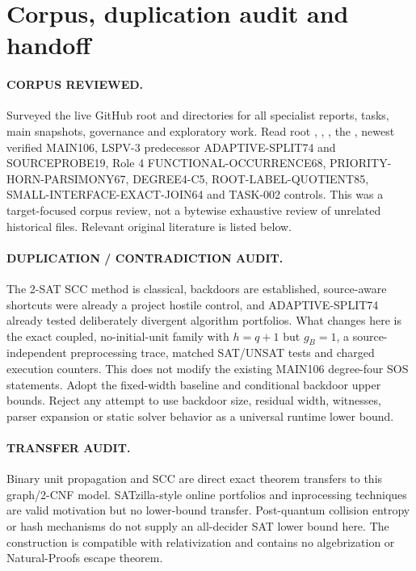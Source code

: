 \documentclass[11pt]{article}
\begin{document}
\section{Corpus, duplication audit and handoff}
\paragraph{CORPUS REVIEWED.}
Surveyed the live GitHub root and directories for all specialist
reports, tasks, main snapshots, governance and exploratory work.
Read root , , ,
the , newest verified MAIN106,
LSPV-3 predecessor ADAPTIVE-SPLIT74 and SOURCEPROBE19,
Role 4 FUNCTIONAL-OCCURRENCE68, PRIORITY-HORN-PARSIMONY67,
DEGREE4-C5, ROOT-LABEL-QUOTIENT85,
SMALL-INTERFACE-EXACT-JOIN64 and TASK-002 controls.
This was a target-focused corpus review, not a bytewise
exhaustive review of unrelated historical files.
Relevant original literature is listed below.

\paragraph{DUPLICATION / CONTRADICTION AUDIT.}
The 2-SAT SCC method is classical, backdoors are established,
source-aware shortcuts were already a project hostile control,
and ADAPTIVE-SPLIT74 already tested deliberately divergent
algorithm portfolios. What changes here is the exact coupled,
no-initial-unit family with $h=q+1$ but $g_B=1$, a
source-independent preprocessing trace, matched SAT/UNSAT
tests and charged execution counters. This does not modify the
existing MAIN106 degree-four SOS statements. Adopt the fixed-width
baseline and conditional backdoor upper bounds. Reject any attempt
to use backdoor size, residual width, witnesses, parser expansion
or static solver behavior as a universal runtime lower bound.

\paragraph{TRANSFER AUDIT.}
Binary unit propagation and SCC are direct exact theorem transfers
to this graph/2-CNF model. SATzilla-style online portfolios and
inprocessing techniques are valid motivation but no lower-bound
transfer. Post-quantum collision entropy or hash mechanisms do not
supply an all-decider SAT lower bound here. The construction is
compatible with relativization and contains no algebrization or
Natural-Proofs escape theorem.
\end{document}
